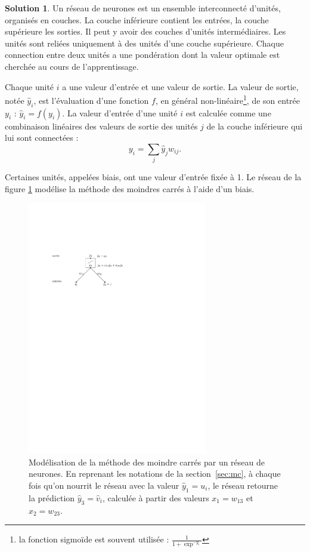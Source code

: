 \documentclass[a4paper,francais]{article}
\theoremstyle{definition}
\newtheorem*{solution}{Solution}
\begin{document}
\begin{solution}
  Un réseau de neurones est un ensemble interconnecté d'unités, organisés en couches.
  La couche inférieure contient les entrées, la couche supérieure les sorties.
  Il peut y avoir des couches d'unités intermédiaires. Les unités sont reliées
  uniquement à des unités d'une couche supérieure. Chaque connection entre deux unités
  a une pondération dont la valeur optimale est cherchée au cours de l'apprentissage. 

  Chaque unité $i$ a une valeur d'entrée et une valeur de sortie. La valeur de sortie, notée $\hat{y}_i$,
  est l'évaluation d'une fonction $f$, en général non-linéaire\footnote{la fonction
    sigmoïde est souvent utilisée : $\frac{1}{1 + \exp^{-y_i}}$},
  de son entrée $y_i$ : $\hat{y}_i = f( y_i )$.
  La valeur d'entrée d'une unité $i$ est calculée comme une combinaison linéaires
  des valeurs de sortie des unités $j$ de la couche inférieure qui lui sont connectées : 
  \begin{equation}
    \label{eq:entree}
    y_i = \sum_j \hat{y}_j w_{ij}. 
  \end{equation}

  Certaines unités, appelées biais, ont une valeur d'entrée fixée à 1.
  Le réseau de la figure \ref{fig:rn} modélise la méthode des moindres carrés
  à l'aide d'un biais.
  \begin{figure}
    \centering
    \includegraphics[width=0.7\textwidth]{rn.pdf}
    \caption{Modélisation de la méthode des moindre carrés par un réseau de neurones.
      En reprenant les notations de la section~\ref{sec:mc}, à chaque fois qu'on nourrit
      le réseau avec la valeur $\hat{y}_1 = u_i$, le réseau retourne la prédiction $\hat{y}_3 = \hat{v}_i$,
      calculée à partir des valeurs $x_1 = w_{13}$ et $x_2 = w_{23}$. }
    \label{fig:rn}
  \end{figure}
  
\end{solution}
\end{document}
